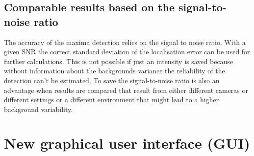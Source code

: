 \subsection{Comparable results based on the signal-to-noise ratio}
The accuracy of the maxima detection relies on the signal to noise ratio. With a given SNR the correct standard deviation of the localisation error can be used for further calculations. This is not possible if just an intensity is saved because without information about the backgrounds variance the reliability of the detection can't be estimated.\newline
To save the signal-to-noise ratio is also an advantage when results are compared that result from either different cameras or different settings or a different environment that might lead to a higher background variability. 


\section{New graphical user interface (GUI)}
